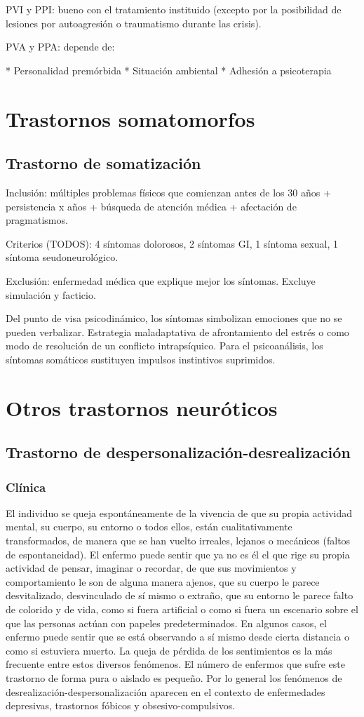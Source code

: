 \documentclass{scrbook}
\begin{document}
PVI y PPI: bueno con el tratamiento instituido (excepto por la posibilidad de lesiones por autoagresión o traumatismo durante las crisis).

PVA y PPA: depende de:

* Personalidad premórbida
* Situación ambiental
* Adhesión a psicoterapia
\chapter{Trastornos somatomorfos}
\section*{Trastorno de somatización}
Inclusión: múltiples problemas físicos que comienzan antes de los 30 años + persistencia x años + búsqueda de atención médica + afectación de pragmatismos.

Criterios (TODOS): 4 síntomas dolorosos, 2 síntomas GI, 1 síntoma sexual, 1 síntoma seudoneurológico.

Exclusión: enfermedad médica que explique mejor los síntomas. Excluye simulación y facticio.

Del punto de visa psicodinámico, los síntomas simbolizan emociones que no se pueden verbalizar. Estrategia maladaptativa de afrontamiento del estrés o como modo de resolución de un conflicto intrapsíquico.
Para el psicoanálisis, los síntomas somáticos sustituyen impulsos instintivos suprimidos.
\printbibliography
\chapter{Otros trastornos neuróticos}
\section*{Trastorno de despersonalización-desrealización}
\subsection*{Clínica}
El individuo se queja espontáneamente de la vivencia de que su propia actividad mental, su cuerpo, su entorno o todos ellos, están cualitativamente transformados, de manera que se han vuelto irreales, lejanos o mecánicos (faltos de espontaneidad). El enfermo puede sentir que ya no es él el que rige su propia actividad de pensar, imaginar o recordar, de que sus movimientos y comportamiento le son de alguna manera ajenos, que su cuerpo le parece desvitalizado, desvinculado de sí mismo o extraño, que su entorno le parece falto de colorido y de vida, como si fuera artificial o como si fuera un escenario sobre el que las personas actúan con papeles predeterminados. En algunos casos, el enfermo puede sentir que se está observando a sí mismo desde cierta distancia o como si estuviera muerto. La queja de pérdida de los sentimientos es la más frecuente entre estos diversos fenómenos. El número de enfermos que sufre este trastorno de forma pura o aislado es pequeño. Por lo general los fenómenos de desrealización-despersonalización aparecen en el contexto de enfermedades depresivas, trastornos fóbicos y obsesivo-compulsivos. 
\end{document}
